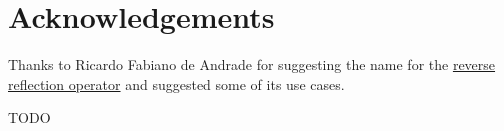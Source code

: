 \section{Acknowledgements}

Thanks to Ricardo Fabiano de Andrade for suggesting the name \verb@unreflexpr@ for
the \hyperref[fut-reverse-reflection]{reverse reflection operator} and
suggested some of its use cases.

TODO
